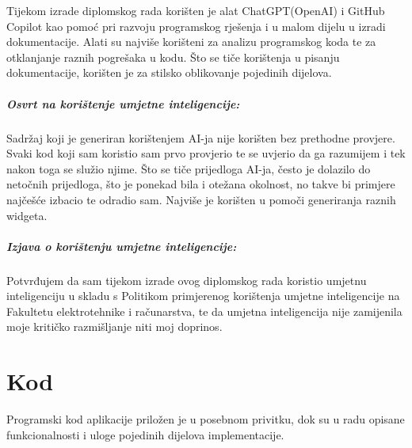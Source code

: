 \documentclass[diplomskirad]{fer}
\begin{document}

\begin{izjavaoui}

  Tijekom izrade diplomskog rada korišten je alat ChatGPT(OpenAI) i GitHub Copilot kao pomoć pri razvoju programskog rješenja i u malom dijelu u izradi dokumentacije. Alati su najviše korišteni za analizu programskog koda te za otklanjanje raznih pogrešaka u kodu. Što se tiče korištenja u pisanju dokumentacije, korišten je za stilsko oblikovanje pojedinih dijelova.
  
  \paragraph{Osvrt na korištenje umjetne inteligencije:}
  Sadržaj koji je generiran korištenjem AI-ja nije korišten bez prethodne provjere. Svaki kod koji sam koristio sam prvo provjerio te se uvjerio da ga razumijem i tek nakon toga se služio njime. Što se tiče prijedloga AI-ja, često je dolazilo do netočnih prijedloga, što je ponekad bila i otežana okolnost, no takve bi primjere najčešće izbacio te odradio sam. Najviše je korišten u pomoči generiranja raznih widgeta. 

  \paragraph{Izjava o korištenju umjetne inteligencije:}
  Potvrđujem da sam tijekom izrade ovog diplomskog rada koristio umjetnu inteligenciju u skladu s
  Politikom primjerenog korištenja umjetne inteligencije na Fakultetu elektrotehnike i računarstva,
  te da umjetna inteligencija nije zamijenila moje kritičko razmišljanje niti moj doprinos.
  
\end{izjavaoui}



\backmatter

\chapter{Kod}
Programski kod aplikacije priložen je u posebnom privitku, dok su u radu opisane funkcionalnosti i uloge pojedinih dijelova implementacije.
\end{document}
